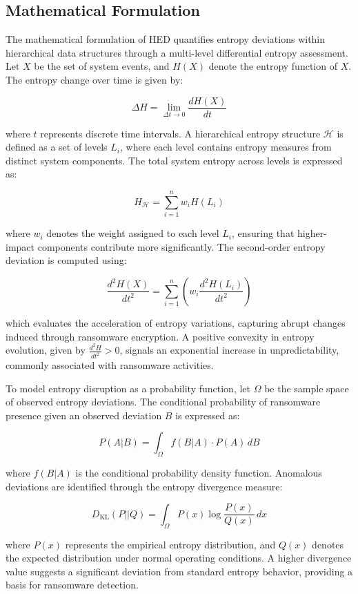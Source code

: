 \documentclass[lettersize,journal]{IEEEtran}
\begin{document}
\subsection{Mathematical Formulation}

The mathematical formulation of HED quantifies entropy deviations within hierarchical data structures through a multi-level differential entropy assessment. Let \( X \) be the set of system events, and \( H(X) \) denote the entropy function of \( X \). The entropy change over time is given by:

\[
\Delta H = \lim_{\Delta t \to 0} \frac{d H(X)}{d t}
\]

where \( t \) represents discrete time intervals. A hierarchical entropy structure \( \mathcal{H} \) is defined as a set of levels \( L_i \), where each level contains entropy measures from distinct system components. The total system entropy across levels is expressed as:

\[
H_{\mathcal{H}} = \sum_{i=1}^{n} w_i H(L_i)
\]

where \( w_i \) denotes the weight assigned to each level \( L_i \), ensuring that higher-impact components contribute more significantly. The second-order entropy deviation is computed using:

\[
\frac{d^2 H(X)}{d t^2} = \sum_{i=1}^{n} \left( w_i \frac{d^2 H(L_i)}{d t^2} \right)
\]

which evaluates the acceleration of entropy variations, capturing abrupt changes induced through ransomware encryption. A positive convexity in entropy evolution, given by \( \frac{d^2 H}{d t^2} > 0 \), signals an exponential increase in unpredictability, commonly associated with ransomware activities.

To model entropy disruption as a probability function, let \( \Omega \) be the sample space of observed entropy deviations. The conditional probability of ransomware presence given an observed deviation \( B \) is expressed as:

\[
P(A|B) = \int_{\Omega} f(B|A) \cdot P(A) \, dB
\]

where \( f(B|A) \) is the conditional probability density function. Anomalous deviations are identified through the entropy divergence measure:

\[
D_{\text{KL}}(P||Q) = \int_{\Omega} P(x) \log \frac{P(x)}{Q(x)} \, dx
\]

where \( P(x) \) represents the empirical entropy distribution, and \( Q(x) \) denotes the expected distribution under normal operating conditions. A higher divergence value suggests a significant deviation from standard entropy behavior, providing a basis for ransomware detection.
\end{document}
